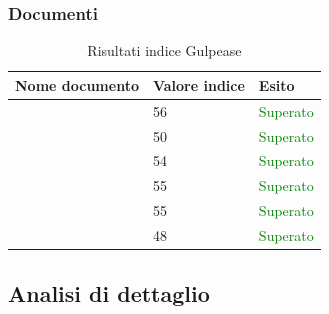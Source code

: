 	 	\subsubsection{Documenti}
		\begin{table}[!ht]
			\begin{center}
				\begin{tabularx}{0.9\textwidth}{|l|l|X|}
					\hline
					\textbf{Nome documento} & \textbf{Valore indice} & \textbf{Esito}\\
					\hline						
					\docNameVersionAdR & 56 & \textcolor{green}{Superato}\\
					\hline
					\docNameVersionGlo & 50 & \textcolor{green}{Superato}\\
					\hline					
					\docNameVersionNdP & 54 & \textcolor{green}{Superato}\\
					\hline					
					\docNameVersionPdP & 55 & \textcolor{green}{Superato}\\
					\hline					
					\docNameVersionPdQ & 55 & \textcolor{green}{Superato}\\
					\hline					
					\docNameVersionSdF & 48 & \textcolor{green}{Superato}\\
					\hline				
				\end{tabularx}
			\end{center}
			\caption{Risultati indice Gulpease}
		\end{table}
		\subsection{Analisi di dettaglio}
